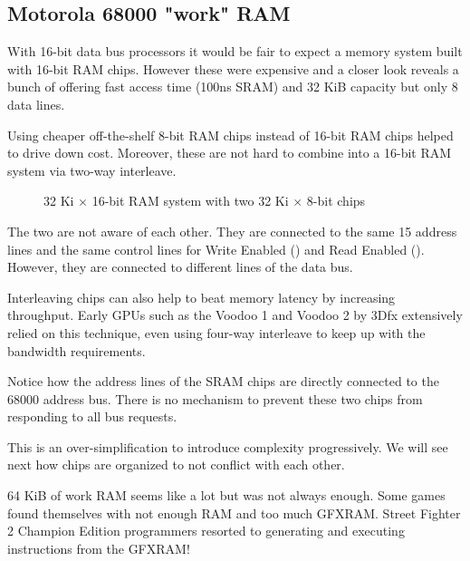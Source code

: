 \subsection{Motorola 68000 "work" RAM}
With 16-bit data bus processors it would be fair to expect a memory system built with 16-bit RAM chips. However these were expensive and a closer look reveals a bunch of  offering fast access time (100ns SRAM) and 32 KiB capacity but only 8 data lines.

\pagebreak

Using cheaper off-the-shelf 8-bit RAM chips instead of 16-bit RAM chips helped to drive down cost. Moreover, these are not hard to combine into a 16-bit RAM system via two-way interleave.

\begin{figure}[H]
\caption*{32 Ki $\times$ 16-bit RAM system with two 32 Ki $\times$ 8-bit chips}
\end{figure}

The two  are not aware of each other. They are connected to the same 15 address lines and the same control lines for Write Enabled () and Read Enabled (). However, they are connected to different lines of the data bus.


 \begin{trivia}
Interleaving chips can also help to beat memory latency by increasing throughput. Early GPUs such as the Voodoo 1 and Voodoo 2 by 3Dfx extensively relied on this technique, even using four-way interleave to keep up with the bandwidth requirements\cite{TheStoryOf3Dfx}.  
 \end{trivia}


Notice how the address lines of the SRAM chips are directly connected to the 68000 address bus. There is no mechanism to prevent these two chips from responding to all bus requests. 

This is an over-simplification to introduce complexity progressively. We will see next how chips are organized to not conflict with each other.

 \begin{trivia}
 64 KiB of work RAM seems like a lot but was not always enough. Some games found themselves with not enough RAM and too much GFXRAM. Street Fighter 2 Champion Edition programmers resorted to generating and executing instructions from the GFXRAM\cite{mame_driver}!
 \end{trivia}
\pagebreak








